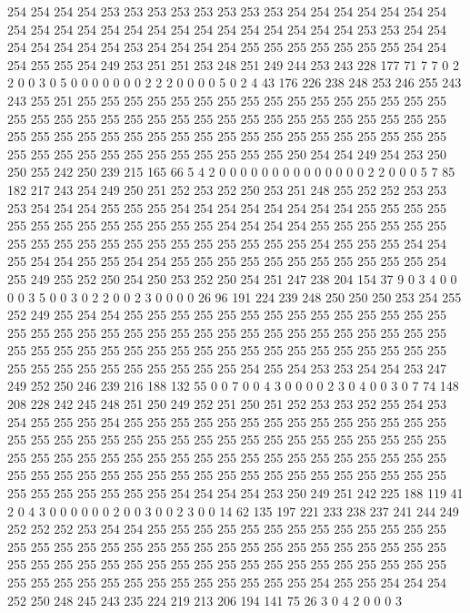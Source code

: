 254 254 254 254 253 253 253 253 253 253 253 253 254 254 254 254 254 254 254 254
254 254 254 254 254 254 254 254 254 254 254 254 254 254 253 253 254 254 254 254
254 254 254 253 254 254 254 254 255 255 255 255 255 255 255 254 254 254 255 255
254 249 253 251 251 253 248 251 249 244 253 243 228 177 71 7 7 0 2 2
0 0 3 0 5 0 0 0 0 0 0 0 2 2 2 0 0 0 0 5
0 2 4 43 176 226 238 248 253 246 255 243 243 255 251 255 255 255 255 255
255 255 255 255 255 255 255 255 255 255 255 255 255 255 255 255 255 255 255 255
255 255 255 255 255 255 255 255 255 255 255 255 255 255 255 255 255 255 255 255
255 255 255 255 255 255 255 255 255 255 255 255 255 255 255 255 255 255 255 255
255 250 254 254 249 254 253 250 250 255 242 250 239 215 165 66 5 4 2 0
0 0 0 0 0 0 0 0 0 0 0 0 0 2 2 0 0 0 5 7
85 182 217 243 254 249 250 251 252 253 252 250 253 251 248 255 252 252 253 253
253 254 254 254 255 255 255 254 254 254 254 254 254 254 254 255 255 255 255 255
255 255 255 255 255 255 255 255 254 254 254 254 255 255 255 255 255 255 255 255
255 255 255 255 255 255 255 255 255 255 255 254 255 255 255 254 254 255 254 254
255 255 254 254 255 255 255 255 255 255 255 255 255 255 255 254 255 249 255 252
250 254 250 253 252 250 254 251 247 238 204 154 37 9 0 3 4 0 0 0
0 3 5 0 0 3 0 2 2 0 0 2 3 0 0 0 0 26 96 191
224 239 248 250 250 250 253 254 255 252 249 255 254 254 255 255 255 255 255 255
255 255 255 255 255 255 255 255 255 255 255 255 255 255 255 255 255 255 255 255
255 255 255 255 255 255 255 255 255 255 255 255 255 255 255 255 255 255 255 255
255 255 255 255 255 255 255 255 255 255 255 255 255 255 255 255 254 255 254 253
253 254 254 253 247 249 252 250 246 239 216 188 132 55 0 0 7 0 0 4
3 0 0 0 0 2 3 0 4 0 0 3 0 7 74 148 208 228 242 245
248 251 250 249 252 251 250 251 252 253 253 252 255 254 253 254 255 255 255 254
255 255 255 255 255 255 255 255 255 255 255 255 255 255 255 255 255 255 255 255
255 255 255 255 255 255 255 255 255 255 255 255 255 255 255 255 255 255 255 255
255 255 255 255 255 255 255 255 255 255 255 255 255 255 255 255 255 255 255 255
255 255 255 255 255 255 255 255 255 255 255 255 255 255 255 255 255 255 254 254
254 254 253 250 249 251 242 225 188 119 41 2 0 4 3 0 0 0 0 0
0 2 0 0 3 0 0 2 3 0 0 14 62 135 197 221 233 238 237 241
244 249 252 252 252 253 254 254 255 255 255 255 255 255 255 255 255 255 255 255
255 255 255 255 255 255 255 255 255 255 255 255 255 255 255 255 255 255 255 255
255 255 255 255 255 255 255 255 255 255 255 255 255 255 255 255 255 255 255 255
255 255 255 255 255 255 255 255 255 255 255 255 254 255 255 254 254 254 252 250
248 245 243 235 224 219 213 206 194 141 75 26 3 0 4 2 0 0 0 3
